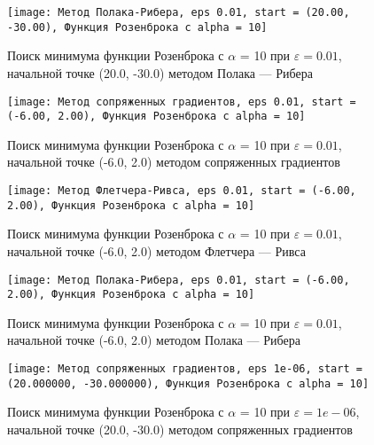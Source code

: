             \begin{figure}[H]
	        \centering
	        \texttt{[image: Метод Полака-Рибера, eps 0.01, start = (20.00, -30.00), Функция Розенброка с alpha = 10]}%
	        \caption{Поиск минимума функции Розенброка с $\alpha$ = 10 при $\varepsilon = 0.01$, начальной точке (20.0, -30.0) методом Полака --- Рибера}
	        \vspace*{-1.2cm}
            \end{figure}
            
            \begin{figure}[H]
	        \centering
	        \texttt{[image: Метод сопряженных градиентов, eps 0.01, start = (-6.00, 2.00), Функция Розенброка с alpha = 10]}%
	        \caption{Поиск минимума функции Розенброка с $\alpha$ = 10 при $\varepsilon = 0.01$, начальной точке (-6.0, 2.0) методом сопряженных градиентов}
	        \vspace*{-1.2cm}
            \end{figure}
            
            \begin{figure}[H]
	        \centering
	        \texttt{[image: Метод Флетчера-Ривса, eps 0.01, start = (-6.00, 2.00), Функция Розенброка с alpha = 10]}%
	        \caption{Поиск минимума функции Розенброка с $\alpha$ = 10 при $\varepsilon = 0.01$, начальной точке (-6.0, 2.0) методом Флетчера --- Ривса}
	        \vspace*{-1.2cm}
            \end{figure}
            
            \begin{figure}[H]
	        \centering
	        \texttt{[image: Метод Полака-Рибера, eps 0.01, start = (-6.00, 2.00), Функция Розенброка с alpha = 10]}%
	        \caption{Поиск минимума функции Розенброка с $\alpha$ = 10 при $\varepsilon = 0.01$, начальной точке (-6.0, 2.0) методом Полака --- Рибера}
	        \vspace*{-1.2cm}
            \end{figure}
            
            \begin{figure}[H]
	        \centering
	        \texttt{[image: Метод сопряженных градиентов, eps 1e-06, start = (20.000000, -30.000000), Функция Розенброка с alpha = 10]}%
	        \caption{Поиск минимума функции Розенброка с $\alpha$ = 10 при $\varepsilon = 1e-06$, начальной точке (20.0, -30.0) методом сопряженных градиентов}
	        \vspace*{-1.2cm}
            \end{figure}
            
